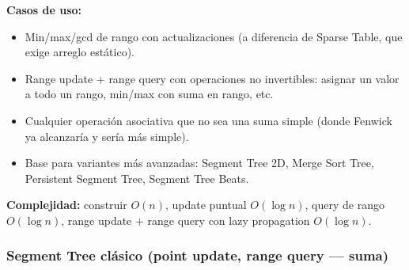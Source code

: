 \documentclass[10pt,a4paper,twocolumn]{article}
\begin{document}
\textbf{Casos de uso:}

\begin{itemize}
    \item Min/max/gcd de rango con actualizaciones (a diferencia de
    Sparse Table, que exige arreglo estático).
    \item Range update + range query con operaciones no invertibles:
    asignar un valor a todo un rango, min/max con suma en rango, etc.
    \item Cualquier operación asociativa que no sea una suma simple
    (donde Fenwick ya alcanzaría y sería más simple).
    \item Base para variantes más avanzadas: Segment Tree 2D, Merge
    Sort Tree, Persistent Segment Tree, Segment Tree Beats.
\end{itemize}

\textbf{Complejidad:} construir $O(n)$, update puntual $O(\log n)$,
query de rango $O(\log n)$, range update + range query con lazy
propagation $O(\log n)$.


\subsubsection{Segment Tree clásico (point update, range query — suma)}
\end{document}
